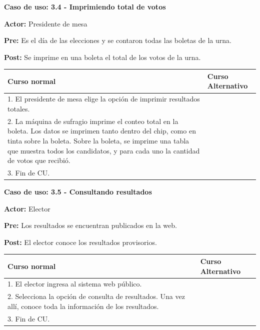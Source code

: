 \textbf{Caso de uso: 3.4 - Imprimiendo total de votos}

\textbf{Actor:} Presidente de mesa

\textbf{Pre:} Es el día de las elecciones y se contaron todas las boletas de la urna.

\textbf{Post:} Se imprime en una boleta el total de los votos de la urna.

\begin{table}[h!]
	
 \begin{tabular}{|p{7.5cm} | p{7.5cm}|} 
 \hline
 \textbf{Curso normal} & \textbf{Curso Alternativo} \\
 \hline


1. El presidente de mesa elige la opción de imprimir resultados totales. & \\
\hline

2. La máquina de sufragio imprime el conteo total en la boleta. Los datos se imprimen tanto dentro del chip, como en tinta sobre la boleta. Sobre la boleta, se imprime una tabla que muestra todos los candidatos, y para cada uno la cantidad de votos que recibió. & \\
\hline

3. Fin de CU. & \\
\hline
\end{tabular}
\end{table}


\textbf{Caso de uso: 3.5 - Consultando resultados} 

\textbf{Actor:} Elector

\textbf{Pre:} Los resultados se encuentran publicados en la web.

\textbf{Post:} El elector conoce los resultados provisorios.

\begin{table}[h!]
	
 \begin{tabular}{|p{7.5cm} | p{7.5cm}|} 
 \hline
 \textbf{Curso normal} & \textbf{Curso Alternativo} \\
 \hline
 
1. El elector ingresa al sistema web público. & \\
\hline


2. Selecciona la opción de consulta de resultados. Una vez allí, conoce toda la información de los resultados. & \\
\hline


3. Fin de CU. & \\
\hline
\end{tabular}
\end{table}



